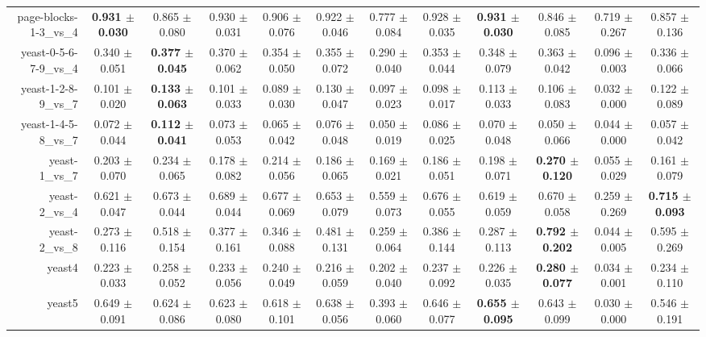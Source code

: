\begin{table}[!ht]
{\begin{tabular}{r c c c c c c c c c c c}
page-blocks-1-3\_vs\_4 & \textbf{0.931 $\pm$ 0.030} & 0.865 $\pm$ 0.080 & 0.930 $\pm$ 0.031 & 0.906 $\pm$ 0.076 & 0.922 $\pm$ 0.046 & 0.777 $\pm$ 0.084 & 0.928 $\pm$ 0.035 & \textbf{0.931 $\pm$ 0.030} & 0.846 $\pm$ 0.085 & 0.719 $\pm$ 0.267 & 0.857 $\pm$ 0.136 \\
yeast-0-5-6-7-9\_vs\_4 & 0.340 $\pm$ 0.051 & \textbf{0.377 $\pm$ 0.045} & 0.370 $\pm$ 0.062 & 0.354 $\pm$ 0.050 & 0.355 $\pm$ 0.072 & 0.290 $\pm$ 0.040 & 0.353 $\pm$ 0.044 & 0.348 $\pm$ 0.079 & 0.363 $\pm$ 0.042 & 0.096 $\pm$ 0.003 & 0.336 $\pm$ 0.066 \\
yeast-1-2-8-9\_vs\_7 & 0.101 $\pm$ 0.020 & \textbf{0.133 $\pm$ 0.063} & 0.101 $\pm$ 0.033 & 0.089 $\pm$ 0.030 & 0.130 $\pm$ 0.047 & 0.097 $\pm$ 0.023 & 0.098 $\pm$ 0.017 & 0.113 $\pm$ 0.033 & 0.106 $\pm$ 0.083 & 0.032 $\pm$ 0.000 & 0.122 $\pm$ 0.089 \\
yeast-1-4-5-8\_vs\_7 & 0.072 $\pm$ 0.044 & \textbf{0.112 $\pm$ 0.041} & 0.073 $\pm$ 0.053 & 0.065 $\pm$ 0.042 & 0.076 $\pm$ 0.048 & 0.050 $\pm$ 0.019 & 0.086 $\pm$ 0.025 & 0.070 $\pm$ 0.048 & 0.050 $\pm$ 0.066 & 0.044 $\pm$ 0.000 & 0.057 $\pm$ 0.042 \\
yeast-1\_vs\_7 & 0.203 $\pm$ 0.070 & 0.234 $\pm$ 0.065 & 0.178 $\pm$ 0.082 & 0.214 $\pm$ 0.056 & 0.186 $\pm$ 0.065 & 0.169 $\pm$ 0.021 & 0.186 $\pm$ 0.051 & 0.198 $\pm$ 0.071 & \textbf{0.270 $\pm$ 0.120} & 0.055 $\pm$ 0.029 & 0.161 $\pm$ 0.079 \\
yeast-2\_vs\_4 & 0.621 $\pm$ 0.047 & 0.673 $\pm$ 0.044 & 0.689 $\pm$ 0.044 & 0.677 $\pm$ 0.069 & 0.653 $\pm$ 0.079 & 0.559 $\pm$ 0.073 & 0.676 $\pm$ 0.055 & 0.619 $\pm$ 0.059 & 0.670 $\pm$ 0.058 & 0.259 $\pm$ 0.269 & \textbf{0.715 $\pm$ 0.093} \\
yeast-2\_vs\_8 & 0.273 $\pm$ 0.116 & 0.518 $\pm$ 0.154 & 0.377 $\pm$ 0.161 & 0.346 $\pm$ 0.088 & 0.481 $\pm$ 0.131 & 0.259 $\pm$ 0.064 & 0.386 $\pm$ 0.144 & 0.287 $\pm$ 0.113 & \textbf{0.792 $\pm$ 0.202} & 0.044 $\pm$ 0.005 & 0.595 $\pm$ 0.269 \\
yeast4 & 0.223 $\pm$ 0.033 & 0.258 $\pm$ 0.052 & 0.233 $\pm$ 0.056 & 0.240 $\pm$ 0.049 & 0.216 $\pm$ 0.059 & 0.202 $\pm$ 0.040 & 0.237 $\pm$ 0.092 & 0.226 $\pm$ 0.035 & \textbf{0.280 $\pm$ 0.077} & 0.034 $\pm$ 0.001 & 0.234 $\pm$ 0.110 \\
yeast5 & 0.649 $\pm$ 0.091 & 0.624 $\pm$ 0.086 & 0.623 $\pm$ 0.080 & 0.618 $\pm$ 0.101 & 0.638 $\pm$ 0.056 & 0.393 $\pm$ 0.060 & 0.646 $\pm$ 0.077 & \textbf{0.655 $\pm$ 0.095} & 0.643 $\pm$ 0.099 & 0.030 $\pm$ 0.000 & 0.546 $\pm$ 0.191 \\

\end{tabular}}
\end{table}
